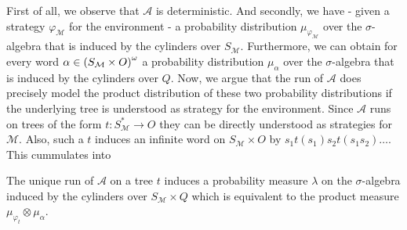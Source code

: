 First of all, we observe that $\mathcal{A}$ is deterministic. And secondly, we
have - given a strategy $\varphi_{\mathcal{M}}$ for the environment - a
probability distribution $\mu_{\varphi_{\mathcal{M}}}$ over the
$\sigma$-algebra that is induced by the cylinders over $S_{\mathcal{M}}$.
Furthermore, we can obtain for every word
$\alpha\in\left(S_{\mathcal{M}}\times O\right)^{\omega}$ a probability distribution
$\mu_{\alpha}$ over the $\sigma$-algebra that is induced by the cylinders over
$Q$. Now, we argue that the run of $\mathcal{A}$ does precisely model the
product distribution of these two probability distributions if the underlying
tree is understood as strategy for the environment. Since $\mathcal{A}$ runs on
trees of the form $t:S_{\mathcal{M}}^{*}\rightarrow O$ they can be directly
understood as strategies for $\mathcal{M}$. Also, such a $t$ induces an
infinite word on $S_{\mathcal{M}}\times O$ by
$s_{1}t(s_{1})s_{2}t(s_{1}s_{2})\dots$. This cummulates into
\begin{lemma}
  The unique run of $\mathcal{A}$ on a tree $t$ induces a probability measure
  $\lambda$ on the $\sigma$-algebra induced by the cylinders over
  $S_{\mathcal{M}}\times Q$ which is equivalent to the product measure
  $\mu_{\varphi_{t}}\otimes \mu_{\alpha}$.
\end{lemma}
